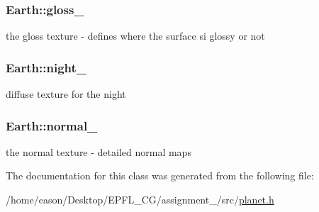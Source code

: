 \subsubsection[{\texorpdfstring{gloss\+\_\+}{gloss_}}]{ Earth\+::gloss\+\_\+}\hypertarget{classEarth_a3871456704afd0fd8cea9a7752117806}{}\label{classEarth_a3871456704afd0fd8cea9a7752117806}


the gloss texture -\/ defines where the surface si glossy or not 

\subsubsection[{\texorpdfstring{night\+\_\+}{night_}}]{ Earth\+::night\+\_\+}\hypertarget{classEarth_a79c4c581fa5cafc19218e03b5336fe35}{}\label{classEarth_a79c4c581fa5cafc19218e03b5336fe35}


diffuse texture for the night 

\subsubsection[{\texorpdfstring{normal\+\_\+}{normal_}}]{ Earth\+::normal\+\_\+}\hypertarget{classEarth_a70ca723027d252427f59c86f6e6f1791}{}\label{classEarth_a70ca723027d252427f59c86f6e6f1791}


the normal texture -\/ detailed normal maps 



The documentation for this class was generated from the following file\+:\begin{DoxyCompactItemize}
\item 
/home/eason/\+Desktop/\+E\+P\+F\+L\+\_\+\+C\+G/assignment\+\_/src/\hyperlink{planet_8h}{planet.\+h}\end{DoxyCompactItemize}
